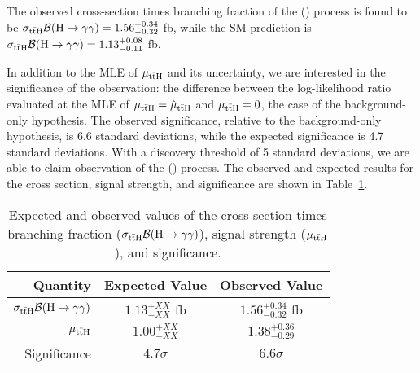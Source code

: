 The observed cross-section times branching fraction of the \ttH (\Hgg) process is found to be $\sigma_{\mathrm{t\bar{t}H}} \mathcal B(\text{H} \to \gamma \gamma) = 1.56^{+0.34}_{-0.32}$ fb, while the SM prediction is $\sigma_{\mathrm{t\bar{t}H}} \mathcal B(\text{H} \to \gamma \gamma) = 1.13^{+0.08}_{-0.11}$ fb.

In addition to the MLE of $\mu_{\mathrm{t\bar{t}H}}$ and its uncertainty, we are interested in the significance of the observation: the difference between the log-likelihood ratio evaluated at the MLE of $\mu_{\mathrm{t\bar{t}H}} = \hat{\mu}_{\mathrm{t\bar{t}H}}$ and $\mu_{\mathrm{t\bar{t}H}} = 0$, the case of the background-only hypothesis.
The observed significance, relative to the background-only hypothesis, is 6.6 standard deviations, while the expected significance is 4.7 standard deviations.
With a discovery threshold of 5 standard deviations, we are able to claim observation of the \ttH (\Hgg) process.
The observed and expected results for the cross section, signal strength, and significance are shown in Table~\ref{tab:tth_results}.
\begin{table} [htbp!]
    \centering
    \begin{tabular}{r c c} \hline \hline
        Quantity & Expected Value & Observed Value \\ \hline
        $\sigma_{\mathrm{t\bar{t}H}} \mathcal B(\text{H} \to \gamma \gamma)$ & $1.13^{+XX}_{-XX}$ fb & $1.56^{+0.34}_{-0.32}$ fb \\
        $\mu_{\mathrm{t\bar{t}H}}$ & $1.00^{+XX}_{-XX}$ & $1.38^{+0.36}_{-0.29}$ \\
        Significance & $4.7\sigma$ & $6.6\sigma$ \\ \hline \hline
    \end{tabular}
    \caption{Expected and observed values of the cross section times branching fraction ($\sigma_{\mathrm{t\bar{t}H}} \mathcal B(\text{H} \to \gamma \gamma)$), signal strength ($\mu_{\mathrm{t\bar{t}H}}$), and significance.}
    \label{tab:tth_results}
\end{table}
